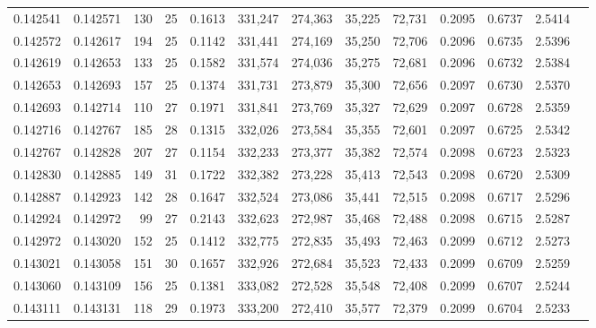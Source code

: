 \begin{tabular}{rrrrrrrrrrrrr}
0.142541 & 0.142571 & 130 &  25 &                                     0.1613 & 331,247 & 274,363 &  35,225 &  72,731 & 0.2095 & 0.6737 & 2.5414 \\
0.142572 & 0.142617 & 194 &  25 &                                     0.1142 & 331,441 & 274,169 &  35,250 &  72,706 & 0.2096 & 0.6735 & 2.5396 \\
0.142619 & 0.142653 & 133 &  25 &                                     0.1582 & 331,574 & 274,036 &  35,275 &  72,681 & 0.2096 & 0.6732 & 2.5384 \\
0.142653 & 0.142693 & 157 &  25 &                                     0.1374 & 331,731 & 273,879 &  35,300 &  72,656 & 0.2097 & 0.6730 & 2.5370 \\
0.142693 & 0.142714 & 110 &  27 &                                     0.1971 & 331,841 & 273,769 &  35,327 &  72,629 & 0.2097 & 0.6728 & 2.5359 \\
0.142716 & 0.142767 & 185 &  28 &                                     0.1315 & 332,026 & 273,584 &  35,355 &  72,601 & 0.2097 & 0.6725 & 2.5342 \\
0.142767 & 0.142828 & 207 &  27 &                                     0.1154 & 332,233 & 273,377 &  35,382 &  72,574 & 0.2098 & 0.6723 & 2.5323 \\
0.142830 & 0.142885 & 149 &  31 &                                     0.1722 & 332,382 & 273,228 &  35,413 &  72,543 & 0.2098 & 0.6720 & 2.5309 \\
0.142887 & 0.142923 & 142 &  28 &                                     0.1647 & 332,524 & 273,086 &  35,441 &  72,515 & 0.2098 & 0.6717 & 2.5296 \\
0.142924 & 0.142972 &  99 &  27 &                                     0.2143 & 332,623 & 272,987 &  35,468 &  72,488 & 0.2098 & 0.6715 & 2.5287 \\
0.142972 & 0.143020 & 152 &  25 &                                     0.1412 & 332,775 & 272,835 &  35,493 &  72,463 & 0.2099 & 0.6712 & 2.5273 \\
0.143021 & 0.143058 & 151 &  30 &                                     0.1657 & 332,926 & 272,684 &  35,523 &  72,433 & 0.2099 & 0.6709 & 2.5259 \\
0.143060 & 0.143109 & 156 &  25 &                                     0.1381 & 333,082 & 272,528 &  35,548 &  72,408 & 0.2099 & 0.6707 & 2.5244 \\
0.143111 & 0.143131 & 118 &  29 &                                     0.1973 & 333,200 & 272,410 &  35,577 &  72,379 & 0.2099 & 0.6704 & 2.5233 \\

\end{tabular}
